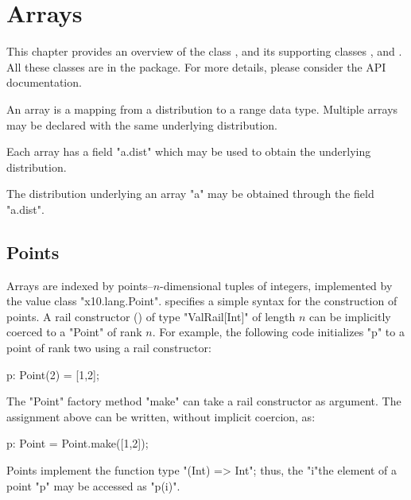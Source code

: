 \chapter{Arrays}\label{XtenArrays}

This chapter provides an overview of the class , and its supporting
classes ,  and . All these classes are in the 
 package. For more details, please consider the API documentation.

An array is a mapping from a distribution to a range data
type. Multiple arrays may be declared with the same underlying
distribution.

Each array has a field \xcd"a.dist" which may be used to
obtain the underlying
distribution.

The distribution underlying an array \xcd"a" may be obtained through
the field \xcd"a.dist".

\section{Points}\label{point-syntax}

Arrays are indexed by points--$n$-dimensional tuples of
integers, implemented by the value class \xcd"x10.lang.Point".
\Xten{} specifies a simple syntax for the construction of points.
A rail constructor () of type \xcd"ValRail[Int]"
of length $n$
can be implicitly coerced to a \xcd"Point" of rank $n$.  For
example, the following code initializes \xcd"p" to a point of
rank two using a rail constructor:

\begin{xten}
p: Point(2) = [1,2];
\end{xten}

The \xcd"Point" factory method \xcd"make" can take a rail constructor as
argument.  The assignment above can be written, without
implicit coercion, as:

\begin{xten}
p: Point = Point.make([1,2]);
\end{xten}

Points implement the function type \xcd"(Int) => Int"; thus, the
\xcd"i"the element of a point \xcd"p" may be accessed as \xcd"p(i)".



